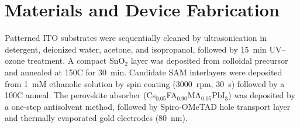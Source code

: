 \section{Materials and Device Fabrication}

Patterned ITO substrates were sequentially cleaned by ultrasonication in
detergent, deionized water, acetone, and isopropanol, followed by 15~min
UV--ozone treatment. A compact SnO$_2$ layer was deposited from
colloidal precursor and annealed at 150\textdegree C for 30~min. Candidate
SAM interlayers were deposited from 1~mM ethanolic solution by spin
coating (3000~rpm, 30~s) followed by a 100\textdegree C anneal. The
perovskite absorber (Cs$_{0.05}$FA$_{0.90}$MA$_{0.05}$PbI$_3$) was
deposited by a one-step antisolvent method, followed by Spiro-OMeTAD hole
transport layer and thermally evaporated gold electrodes (80~nm).
